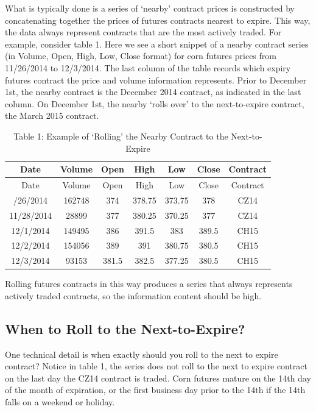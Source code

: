 \documentclass[
  letterpaper,
  DIV=11,
  numbers=noendperiod]{scrreprt}
\begin{document}
What is typically done is a series of `nearby' contract prices is
constructed by concatenating together the prices of futures contracts
nearest to expire. This way, the data always represent contracts that
are the most actively traded. For example, consider table 1. Here we see
a short snippet of a nearby contract series (in Volume, Open, High, Low,
Close format) for corn futures prices from 11/26/2014 to 12/3/2014. The
last column of the table records which expiry futures contract the price
and volume information represents. Prior to December 1st, the nearby
contract is the December 2014 contract, as indicated in the last column.
On December 1st, the nearby `rolls over' to the next-to-expire contract,
the March 2015 contract.

\begin{longtable}[]{@{}ccccccc@{}}
\caption{Table 1: Example of `Rolling' the Nearby Contract to the
Next-to-Expire}\tabularnewline
\toprule\noalign{}
Date & Volume & Open & High & Low & Close & Contract \\
\midrule\noalign{}
\endfirsthead
\toprule\noalign{}
Date & Volume & Open & High & Low & Close & Contract \\
\midrule\noalign{}
\endhead
\bottomrule\noalign{}
\endlastfoot
11/26/2014 & 162748 & 374 & 378.75 & 373.75 & 378 & CZ14 \\
11/28/2014 & 28899 & 377 & 380.25 & 370.25 & 377 & CZ14 \\
12/1/2014 & 149495 & 386 & 391.5 & 383 & 389.5 & CH15 \\
12/2/2014 & 154056 & 389 & 391 & 380.75 & 380.5 & CH15 \\
12/3/2014 & 93153 & 381.5 & 382.5 & 377.25 & 380.5 & CH15 \\
\end{longtable}

Rolling futures contracts in this way produces a series that always
represents actively traded contracts, so the information content should
be high.

\hypertarget{when-to-roll-to-the-next-to-expire}{%
\subsection{When to Roll to the
Next-to-Expire?}\label{when-to-roll-to-the-next-to-expire}}

One technical detail is when exactly should you roll to the next to
expire contract? Notice in table 1, the series does not roll to the next
to expire contract on the last day the CZ14 contract is traded. Corn
futures mature on the 14th day of the month of expiration, or the first
business day prior to the 14th if the 14th falls on a weekend or
holiday.
\end{document}

